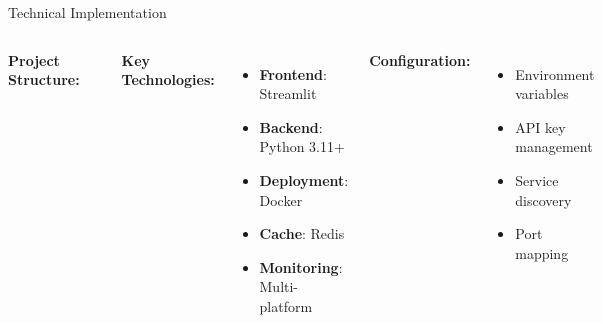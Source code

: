\documentclass[aspectratio=169,11pt]{beamer}
\begin{document}
\begin{frame}{Technical Implementation}
\begin{columns}
\textbf{Project Structure:}
\begin{lstlisting}
training-agentic-ai/
├── agents/
│   ├── multi-agent-financial/
│   ├── stock-analysis-extended/
│   ├── Customer-Support-Triage/
│   └── [13 more agents...]
├── docker-compose.yml
├── requirements.txt
├── .env.example
└── app.py (dashboard)
\end{lstlisting}

\textbf{Key Technologies:}
\begin{itemize}
    \item \textbf{Frontend}: Streamlit
    \item \textbf{Backend}: Python 3.11+
    \item \textbf{Deployment}: Docker
    \item \textbf{Cache}: Redis
    \item \textbf{Monitoring}: Multi-platform
\end{itemize}

\textbf{Configuration:}
\begin{itemize}
    \item Environment variables
    \item API key management
    \item Service discovery
    \item Port mapping
\end{itemize}
\end{columns}
\end{frame}
\end{document}
